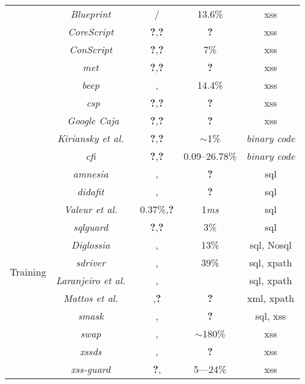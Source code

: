 \documentclass[conference]{IEEEtran}
\newcommand{\tick}{\ding{52}}
\newcommand{\xmark}{\ding{56}}
\begin{document}
\begin{table*}
\begin{threeparttable}
\begin{small}
{\begin{tabular}{l|c|cc|c}
	&  {\it Blueprint}~\cite{LV09} & \tick/\tick & 13.6\% & {\sc xss} \\ 
	&  {\it CoreScript}~\cite{YCIS07} & {\bf ?},{\bf ?} &  {\bf ?} & {\sc xss} \\ 
	&  {\it ConScript}~\cite{ML10} & {\bf ?},{\bf ?} & 7\% & {\sc xss} \\
	&  {\it {\sc met}}~\cite{ELX07} & {\bf ?},{\bf ?} &  {\bf ?} & {\sc xss} \\ 
    &  {\it {\sc beep}}~\cite{TNH07}  & \tick,\tick & 14.4\% & {\sc xss} \\
	&  {\it {\sc csp}} & {\bf ?},{\bf ?} & {\bf ?} & {\sc xss} \\ 
    &  {\it Google Caja} & {\bf ?},{\bf ?} & {\bf ?} & {\sc xss} \\
	&  {\it Kiriansky et al.~\cite{KBA02}} & {\bf ?},{\bf ?} & $\sim$1\% & {\it binary code} \\
	& {\it {\sc cfi}~\cite{ABEL05}} & {\bf ?},{\bf ?} & 0.09--26.78\% & {\it binary code} \\
	\hline
	\hline  
        \multirow{12}{*}{Training}
	&   {\it {\sc amnesia}}~\cite{HO05,HO06,HO05b} & \tick,\tick & {\bf ?} & {\sc sql} \\ 
	&   {\it {\sc didafit}}~\cite{LLW02} & \xmark,\xmark & {\bf ?} & {\sc sql} \\
	&   {\it Valeur et al.}~\cite{VMV05} & 0.37\%,{\bf ?} & 1{\it ms} & {\sc sql} \\
	& 	{\it {\sc sqlg}uard}~\cite{BWS05} & {\bf ?},{\bf ?} & 3\% & {\sc sql} \\
	& 	{\it Diglossia}~\cite{SMS13} & \xmark,\xmark  & 13\% & {\sc sql}, No{\sc sql} \\
	& 	{\it {\sc sd}river}~\cite{MS09,MKS09} & \tick,\tick & 39\% & {\sc sql}, {\sc xp}ath \\
	& 	{\it Laranjeiro et al.}~\cite{LVM09,ALVM09,LVM10} & \xmark,\xmark  & \xmark & {\sc sql}, {\sc xp}ath \\
	& 	{\it Mattos et al.}~\cite{MSM13} & \tick,{\bf ?} &  {\bf ?} & {\sc xml}, {\sc xp}ath \\
	& 	{\it {\sc sm}ask}~\cite{JB07} & \xmark,\xmark & {\bf ?} & {\sc sql}, {\sc xss} \\
	& 	{\it {\sc swap}}~\cite{WPLKK09} & \tick,\tick & $\sim$180\% & {\sc xss} \\ 
    & 	{\it {\sc xssds}}~\cite{JEP08}  & \xmark,\xmark & {\bf ?} &  {\sc xss} \\
    & 	{\it {\sc xss-guard}}~\cite{BV08} & {\bf ?},\xmark & 5---24\% & {\sc xss} \\

\end{tabular}}
\end{small}
\end{threeparttable}
\end{table*}
\end{document}
